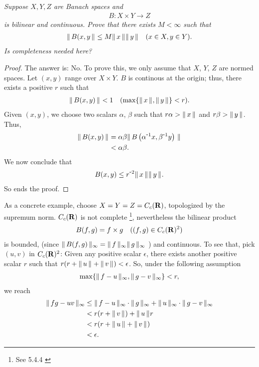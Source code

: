 \textit{
Suppose $X,Y,Z$ are Banach spaces and 
%
  \begin{align*}
    B:X\times Y \to Z
  \end{align*}
is bilinear and continuous. Prove that there exists $M<\infty$ such that 
%
  \begin{align*}
    \| \,B(x, y \, \|_{} \leq M \| \,x \, \|_{}\| \,y \, \|_{} \quad (x\in X, y\in Y).
  \end{align*}
%
Is completeness needed here?}
\begin{proof} The answer is: No. To prove this, we only assume that %
%
  $X$, $Y$, $Z$ %
%
are normed spaces. %
%
Let $(x, y)$ range over $X\times Y$. %
%
$B$ is continous at the origin; thus, there exists a positive $r$ such that %
%
  \begin{align}
    \| \,B(x,y) \, \|_{} < 1 \quad (\max\{\| \,x \, \|_{}, \| \,y \, \|_{}\} < r).
  \end{align}
%
Given $(x, y)$, we choose two scalars  %
%
  $\alpha$, $\beta$ %
%
such that %
%
  $r\alpha > \| \,x \, \|_{} $ and $r\beta >\| \,y \, \|_{}$. %
%
Thus, 
%
  \begin{align}
    \| \,B(x, y) \, \|_{} 
     & = 
    \alpha \beta \| \,
        B\left(
          \alpha^{\text{\small{-}} 1} x, 
          \beta^{\text{\small{-}} 1} y
        \right)
       \, \|_{}\\
    & < \alpha \beta.
  \end{align}
%
We now conclude that %
%
  \begin{align}
      B(x, y)\leq 
    r^{\text{\small{-}} 2} \| \,x \, \|_{}\| \,y \, \|_{}.
  \end{align}
%
So ends the proof. %
%
\end{proof}
\noindent
%
As a concrete example, choose %
%
  $X = Y = Z = C_c({\mathbf R})$, %
%
topologized by the supremum norm. %
%
$C_c({\mathbf R})$ is not complete%
%
  \footnote{
    See 5.4.4 \cite{AnalyseIII} 
  }, %
nevertheless the bilinear product %
%
  \begin{align}
    B(f, g) = f\times g \quad ((f, g)\in C_c(\R)^2) %
  \end{align}
%
is bounded, (since %
    $\| \,B(f,g)  \, \|_{\infty} = \| \,f \, \|_{\infty}\| \,g \, \|_{\infty}$%
) %
and continuous. To see that, pick $(u, v)$ in $C_c({\mathbf R})^2$: %
Given any positive scalar $\epsilon$, %
there exists another positive scalar $r$ such that %
%
  $r(r + \| \,u \, \|_{} + \| \,v \, \|_{}) < \epsilon$. %
%
So, under the following assumption %
%
\begin{align}
  \max\singleton{\norm{\infty}{f-u}, \norm{\infty}{g-v}} < r, %
\end{align}
we reach %
%
  \begin{align}
    \norm{\infty}{fg - uv} %
      & \leq 
    \norm{\infty}{f-u} \cdot \norm{\infty}{g} + 
    \norm{\infty}{u}   \cdot \norm{\infty}{g-v} \\
      & < r ( r + \norm{}{v} )  + \norm{}{u} r \\
      & < r(r + \norm{}{u} + \norm{}{v}) \\
      & < \epsilon. 
  \end{align}
